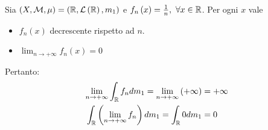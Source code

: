\begin{examplewt}
	Sia $\left(X,\mathcal{M},\mu\right)=\left(\mathbb{R},\mathcal{L}\left(\mathbb{R}\right),m_1\right)$ e $f_n\left(x\right)=\frac{1}{n},\ \forall x\in\mathbb{R}$. Per ogni $x$ vale
	\begin{itemize}
		\item $f_n\left(x\right)$ decrescente rispetto ad $n$.
		\item $\displaystyle\lim_{n\to+\infty}f_n\left(x\right)=0$
	\end{itemize}
Pertanto:
\begin{align*}
	\lim_{n\to+\infty}\int_{\mathbb{R}}f_ndm_1=\lim_{n\to+\infty}\left(+\infty\right)&=+\infty\\
	\int_{\mathbb{R}}\left(\lim_{n\to+\infty}f_n\right)dm_1=\int_{\mathbb{R}}0dm_1&=0
\end{align*}
\end{examplewt}
